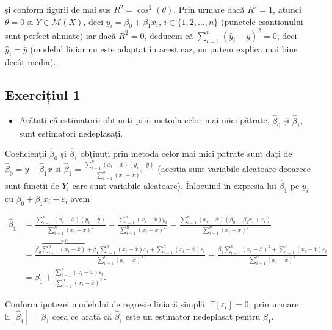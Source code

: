 \documentclass[]{article}
\newenvironment{frshaded*}{%
  \def\FrameCommand{\fboxrule=\FrameRule\fboxsep=\FrameSep \fcolorbox{framecolor}{shadecolor1}}%
  \MakeFramed {\advance\hsize-\width \FrameRestore}}%
{\endMakeFramed}
\newenvironment{rmdblock}[1]
  {\begin{frshaded*}
  \begin{itemize}
  \renewcommand{\labelitemi}{
    \raisebox{-.7\height}[0pt][0pt]{
      {\setkeys{Gin}{width=2em,keepaspectratio}\texttt{[image: images/icons/\#1]}}
    }
  }
  \item
  }
  {
  \end{itemize}
  \end{frshaded*}
  }
\newenvironment{rmdexercise}
  {\begin{rmdblock}{exercise}}
  {\end{rmdblock}}
\begin{document}
și conform figurii de mai sus \(R^2 = \cos^2(\theta)\). Prin urmare dacă
\(R^2 = 1\), atunci \(\theta = 0\) și \(Y\in\mathcal{M}(X)\), deci
\(y_i = \beta_0 + \beta_1 x_i\), \(i\in\{1,2,\ldots,n\}\) (punctele
eșantionului sunt perfect aliniate) iar dacă \(R^2 = 0\), deducem că
\(\sum_{i = 1}^{n}(\hat y_i - \bar y)^2 = 0\), deci
\(\hat y_i = \bar y\) (modelul liniar nu este adaptat în acest caz, nu
putem explica mai bine decât media).

\subsection{Exercițiul 1}\label{exercitiul-1}

\begin{rmdexercise}
Arătați că estimatorii obținuți prin metoda celor mai mici pătrate,
\(\hat\beta_0\) și \(\hat\beta_1\), sunt estimatori nedeplasați.
\end{rmdexercise}

Coeficienții \(\hat\beta_0\) și \(\hat\beta_1\) obținuți prin metoda
celor mai mici pătrate sunt dați de
\(\hat\beta_0 = \bar y - \hat\beta_1 \bar x\) și
\(\hat\beta_1 = \frac{\sum_{i = 1}^{n}(x_i - \bar x)(y_i - \bar y)}{\sum_{i = 1}^{n}(x_i - \bar x)^2}\)
(aceștia sunt variabile aleatoare deoarece sunt funcții de \(Y_i\) care
sunt variabile aleatoare). Înlocuind în expresia lui \(\hat\beta_1\) pe
\(y_i\) cu \(\beta_0+\beta_1 x_i + \varepsilon_i\) avem

\begin{align*}
\hat\beta_1 &= \frac{\sum_{i = 1}^{n}(x_i - \bar x)(y_i - \bar y)}{\sum_{i = 1}^{n}(x_i - \bar x)^2} = \frac{\sum_{i = 1}^{n}(x_i - \bar x)y_i}{\sum_{i = 1}^{n}(x_i - \bar x)^2} = \frac{\sum_{i = 1}^{n}(x_i - \bar x)(\beta_0+\beta_1 x_i + \varepsilon_i)}{\sum_{i = 1}^{n}(x_i - \bar x)^2}\\
  &= \frac{\beta_0\overbrace{\sum_{i = 1}^{n}(x_i - \bar x)}^{ = 0} + \beta_1 \sum_{i = 1}^{n}(x_i - \bar x)x_i + \sum_{i = 1}^{n}(x_i - \bar x)\varepsilon_i}{\sum_{i = 1}^{n}(x_i - \bar x)^2} = \frac{\beta_1 \sum_{i = 1}^{n}(x_i - \bar x)^2 + \sum_{i = 1}^{n}(x_i - \bar x)\varepsilon_i}{\sum_{i = 1}^{n}(x_i - \bar x)^2}\\
  &= \beta_1 + \frac{\sum_{i = 1}^{n}(x_i - \bar x)\varepsilon_i}{\sum_{i = 1}^{n}(x_i - \bar x)^2}.
\end{align*}

Conform ipotezei modelului de regresie liniară simplă,
\(\mathbb{E}[\varepsilon_i] = 0\), prin urmare
\(\mathbb{E}[\hat\beta_1] = \beta_1\) ceea ce arată că \(\hat\beta_1\)
este un estimator nedeplasat pentru \(\beta_1\).
\end{document}
